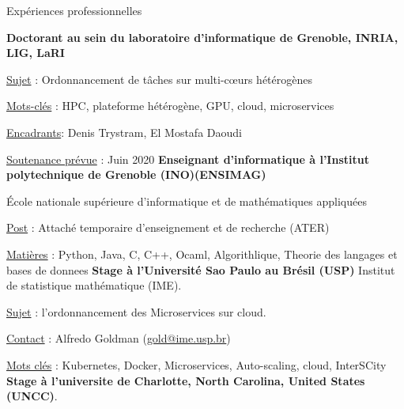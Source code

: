 \begin{rubric}{Expériences professionnelles}



    \textbf{Doctorant au sein du laboratoire d'informatique de Grenoble, INRIA, LIG, LaRI}
    \hfill {} 
    \par \underline{Sujet} : Ordonnancement de tâches sur multi-cœurs hétérogènes
    \par \underline{Mots-clés} : HPC, plateforme hétérogène, GPU, cloud, microservices 
    \par \underline{Encadrants}: Denis Trystram, El Mostafa Daoudi
    \par \underline{Soutenance prévue} : Juin 2020
%
%
    \entry*[$2019 - 2020$] \textbf{Enseignant d'informatique à l'Institut polytechnique de Grenoble (INO)(ENSIMAG)} 
     \hfill{} 
    \par École nationale supérieure d'informatique et de mathématiques appliquées 
    \par \underline{Post} : Attaché temporaire d'enseignement et de recherche (ATER)
    \par \underline{Matières} : Python, Java, C, C++, Ocaml, Algorithlique, Theorie des langages et bases de donnees%
     \textbf{Stage à l'Université Sao Paulo au Brésil (USP)} Institut de statistique mathématique (IME).
     \hfill{} 
    \par \underline{Sujet} : l'ordonnancement des Microservices sur cloud.
    \par \underline{Contact} : Alfredo Goldman (\href{mailto:gold@ime.usp.br}{gold@ime.usp.br})
	\par \underline{Mots clés} : Kubernetes, Docker, Microservices, Auto-scaling, cloud, InterSCity
%
 \textbf{Stage à l’universite de Charlotte, North Carolina, United States (UNCC)}.

\end{rubric}
